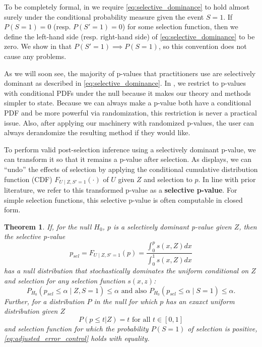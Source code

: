 \documentclass{article}
\newtheorem{theorem}{Theorem}
\begin{document}
To be completely formal, in  we require \eqref{eq:selective_dominance} to hold almost surely under the conditional probability measure given the event $S=1$. If $P(S=1) = 0$ (resp. $P(S'=1) = 0$) for some selection function, then we define the left-hand side (resp. right-hand side) of \eqref{eq:selective_dominance} to be zero. We show in  that $P(S' = 1) \implies P(S=1)$, so this convention does not cause any problems. 

As we will soon see, the majority of p-values that practitioners use are selectively dominant as described in \eqref{eq:selective_dominance}. In , we restrict to p-values with conditional PDFs under the null because it makes our theory and methods simpler to state. Because we can always make a p-value both have a conditional PDF and be more powerful via randomization, this restriction is never a practical issue. Also, after applying our machinery with randomized p-values, the user can always derandomize the resulting method if they would like.

To perform valid post-selection inference using a selectively dominant p-value, we can transform it so that it remains a p-value after selection. As  displays, we can ``undo'' the effects of selection by applying the conditional cumulative distribution function (CDF) $F_{U \mid Z, S' = 1}(\cdot)$ of $U$ given $Z$ and selection to $p$. In line with prior literature, we refer to this transformed p-value as a \textbf{selective p-value}. For simple selection functions, this selective p-value is often computable in closed form. 

\begin{theorem}
    \label{thm:adjustment}
    If, for the null $H_0$, $p$ is a selectively dominant p-value given $Z$, then the selective p-value 
    \begin{equation}
    \label{eq:adjustment}
        p_{sel} = F_{U \mid Z, S' = 1}(p) = \frac{\int_0^p s(x, Z) dx}{\int_0^1 s(x, Z) dx}
    \end{equation}
    has a null distribution that stochastically dominates the uniform conditional on $Z$ and selection for any selection function $s(x, z)$:
    \begin{equation}
        \label{eq:adjusted_error_control}
        P_{H_0}(p_{sel} \leq \alpha \mid Z, S= 1) \leq \alpha \text{ and also }  P_{H_0}(p_{sel} \leq \alpha \mid S= 1) \leq \alpha.
    \end{equation}
    Further, for a distribution $P$ in the null for which $p$ has an exaxct uniform distribution given $Z$ 
    \begin{equation}
        \label{eq:adjusted_error_control_equality}
        P(p \leq t | Z) = t \text{ for all } t \in [0, 1]
    \end{equation}
    and selection function for which the probability $P(S=1)$ of selection is positive, 
    \eqref{eq:adjusted_error_control} holds with equality. 
\end{theorem}
\end{document}
